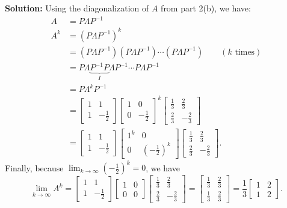\documentclass[10pt]{article}
\theoremstyle{definition}
\theoremstyle{plain}
\begin{document}
\begin{enumerate}[label=(\alph*)]
\textbf{Solution:} Using the diagonalization of $A$ from part 2(b), we have:
\begin{align}
A &= P\Lambda P^{-1} \\
A^k &= (P\Lambda P^{-1})^k \\
&= (P\Lambda P^{-1})(P\Lambda P^{-1}) \cdots (P\Lambda P^{-1}) \qquad (k \text{ times}) \\
&= P\Lambda \underbrace{P^{-1}P}_{I} \Lambda P^{-1} \cdots P\Lambda P^{-1} \\
&= P\Lambda^k P^{-1} \\
&= \begin{bmatrix} 1 & 1 \\ 1 & -\frac{1}{2} \end{bmatrix} \begin{bmatrix} 1 & 0 \\ 0 & -\frac{1}{2} \end{bmatrix}^k \begin{bmatrix} \frac{1}{3} & \frac{2}{3} \\ \frac{2}{3} & -\frac{2}{3} \end{bmatrix} \\
&= \begin{bmatrix} 1 & 1 \\ 1 & -\frac{1}{2} \end{bmatrix} \begin{bmatrix} 1^k & 0 \\ 0 & \left(-\frac{1}{2}\right)^k \end{bmatrix} \begin{bmatrix} \frac{1}{3} & \frac{2}{3} \\ \frac{2}{3} & -\frac{2}{3} \end{bmatrix}.
\end{align}
Finally, because $\lim_{k\to\infty} \left(-\frac{1}{2}\right)^k = 0$, we have
\begin{equation}
\lim_{k\to\infty} A^k = \begin{bmatrix} 1 & 1 \\ 1 & -\frac{1}{2} \end{bmatrix} \begin{bmatrix} 1 & 0 \\ 0 & 0 \end{bmatrix} \begin{bmatrix} \frac{1}{3} & \frac{2}{3} \\ \frac{2}{3} & -\frac{2}{3} \end{bmatrix} = \begin{bmatrix} \frac{1}{3} & \frac{2}{3} \\ \frac{1}{3} & \frac{2}{3} \end{bmatrix} = \frac{1}{3} \begin{bmatrix} 1 & 2 \\ 1 & 2 \end{bmatrix}.
\end{equation}


\end{enumerate}
\end{document}
